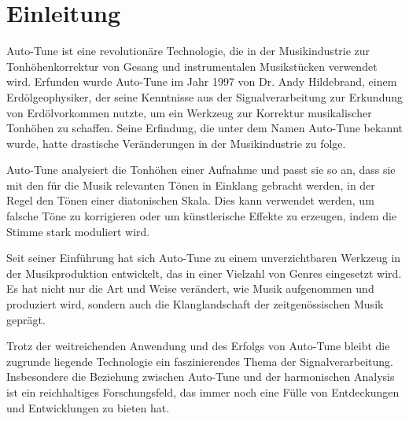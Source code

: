 %
%
%
%
\section{Einleitung\label{autotune:section:teil0}}
Auto-Tune ist eine revolutionäre Technologie, die in der Musikindustrie zur Tonhöhenkorrektur von Gesang und instrumentalen Musikstücken verwendet wird.
Erfunden wurde Auto-Tune im Jahr 1997 von Dr. Andy Hildebrand, einem Erdölgeophysiker, der seine Kenntnisse aus der Signalverarbeitung zur Erkundung von Erdölvorkommen nutzte,
um ein Werkzeug zur Korrektur musikalischer Tonhöhen zu schaffen.
Seine Erfindung, die unter dem Namen Auto-Tune bekannt wurde, hatte drastische Veränderungen in der Musikindustrie zu folge.

Auto-Tune analysiert die Tonhöhen einer Aufnahme und passt sie so an, dass sie mit den für die Musik relevanten Tönen in Einklang gebracht werden, in der Regel den Tönen einer diatonischen Skala.
Dies kann verwendet werden, um falsche Töne zu korrigieren oder um künstlerische Effekte zu erzeugen, indem die Stimme stark moduliert wird.

Seit seiner Einführung hat sich Auto-Tune zu einem unverzichtbaren Werkzeug in der Musikproduktion entwickelt, das in einer Vielzahl von Genres eingesetzt wird.
Es hat nicht nur die Art und Weise verändert, wie Musik aufgenommen und produziert wird, sondern auch die Klanglandschaft der zeitgenössischen Musik geprägt.

Trotz der weitreichenden Anwendung und des Erfolgs von Auto-Tune bleibt die zugrunde liegende Technologie ein faszinierendes Thema der Signalverarbeitung.
Insbesondere die Beziehung zwischen Auto-Tune und der harmonischen Analysis ist ein reichhaltiges Forschungsfeld, das immer noch eine Fülle von Entdeckungen und Entwicklungen zu bieten hat.


